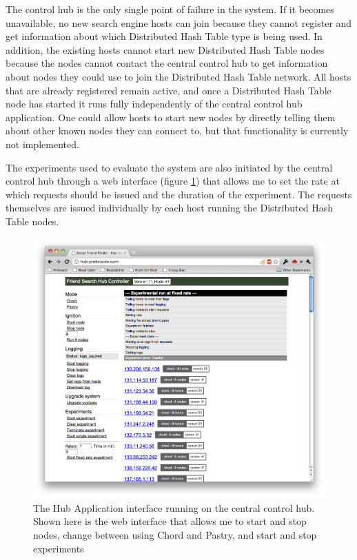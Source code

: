 The control hub is the only single point of failure in the system. If it becomes unavailable, no new search engine hosts can join because they cannot register and get information about which Distributed Hash Table type is being used. In addition, the existing hosts cannot start new Distributed Hash Table nodes because the nodes cannot contact the central control hub to get information about nodes they could use to join the Distributed Hash Table network. All hosts that are already registered remain active, and once a Distributed Hash Table node has started it runs fully independently of the central control hub application.
One could allow hosts to start new nodes by directly telling them about other known nodes they can connect to, but that functionality is currently not implemented.

The experiments used to evaluate the system are also initiated by the central control hub through a web interface (figure \ref{figHubApp}) that allows me to set the rate at which requests should be issued and the duration of the experiment. The requests themselves are issued individually by each host running the Distributed Hash Table nodes.

\begin{figure}[!htb]
\begin{center}
	\includegraphics[width=0.9\linewidth]{illustrations/HubApp.png}
\caption{The Hub Application interface running on the central control hub. Shown here is the web interface that allows me to start and stop nodes, change between using Chord and Pastry, and start and stop experiments}
\label{figHubApp}
\end{center}
\end{figure}

